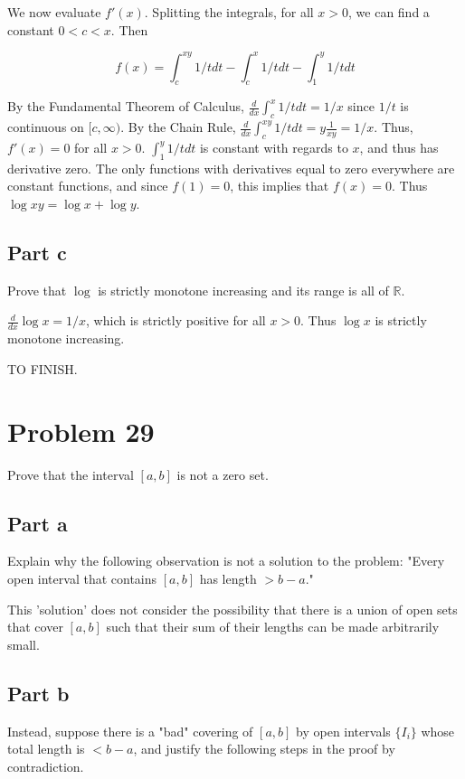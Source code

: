 \documentclass{article}
\newcommand{\R}{\mathbb{R}}
\begin{document}
We now evaluate $f'(x)$. Splitting the integrals, for all $x>0$, we can find a constant $0 < c < x$. Then

\[
f(x) = \int_c^{xy} 1/t dt - \int_c^x 1/t dt - \int_1^y 1/t dt
\]

By the Fundamental Theorem of Calculus, $\frac{d}{dx} \int_c^x 1/t dt = 1/x$ since $1/t$ is continuous on $[c, \infty)$. By the Chain Rule, $\frac{d}{dx} \int_c^{xy} 1/t dt = y\frac{1}{xy} = 1/x$. Thus, $f'(x) = 0$ for all $x > 0$. $\int_1^y 1/t dt$ is constant with regards to $x$, and thus has derivative zero. The only functions with derivatives equal to zero everywhere are constant functions, and since $f(1) = 0$, this implies that $f(x) = 0$. Thus $\log xy = \log x + \log y$.

\subsection*{Part c}

Prove that $\log$ is strictly monotone increasing and its range is all of $\R$.

$\frac{d}{dx} \log x = 1/x$, which is strictly positive for all $x > 0$. Thus $\log x$ is strictly monotone increasing.

TO FINISH.

\section*{Problem 29}

Prove that the interval $[a, b]$ is not a zero set.

\subsection*{Part a}

Explain why the following observation is not a solution to the problem: "Every open interval that contains $[a, b]$ has length $> b-a$."

This 'solution' does not consider the possibility that there is a union of open sets that cover $[a, b]$ such that their sum of their lengths can be made arbitrarily small.

\subsection*{Part b}

Instead, suppose there is a "bad" covering of $[a, b]$ by open intervals $\{I_i\}$ whose total length is $< b-a$, and justify the following steps in the proof by contradiction.
\end{document}
